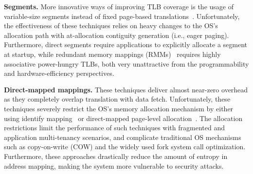 \noindent\textbf{Segments.} More innovative ways of improving TLB coverage is the usage of variable-size segments instead of fixed page-based translations~\cite{karakostas:redundant, park:hybrid, basu:efficient}. Unfortunately, the effectiveness of these techniques relies on heavy changes to the OS's allocation path with at-allocation contiguity generation (i.e., eager paging). Furthermore, direct segments require applications to explicitly allocate a segment at startup, while redundant memory mappings (RMMs)~\cite{karakostas:redundant} requires highly associative power-hungry TLBs, both very unattractive from the programmability and hardware-efficiency perspectives.

\noindent\textbf{Direct-mapped mappings.} These techniques deliver almost near-zero overhead as they completely overlap translation with data fetch. Unfortunately, these techniques severely restrict the OS's memory allocation mechanism by either using identify mapping~\cite{haria:devirtualizing} or direct-mapped page-level allocation~\cite{picorel:near-memory}. The allocation restrictions limit the performance of such techniques with fragmented and application multi-tenancy scenarios, and complicate traditional OS mechanisms such as copy-on-write (COW) and the widely used fork system call optimization. Furthermore, these approaches drastically reduce the amount of entropy in address mapping, making the system more vulnerable to security attacks.



